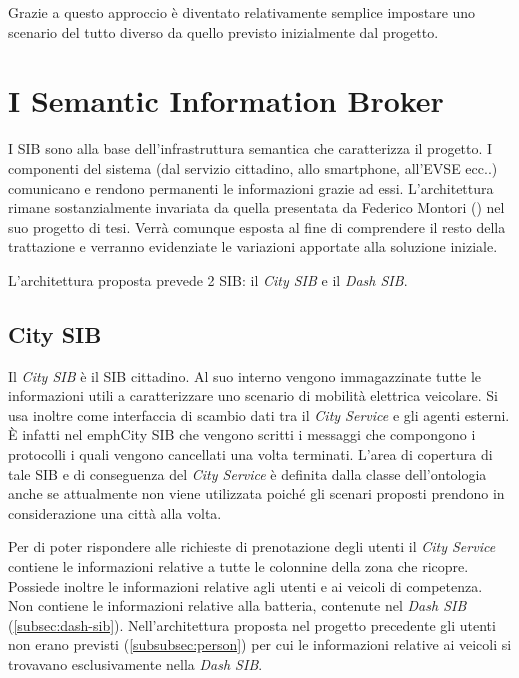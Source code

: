 Grazie a questo approccio è diventato relativamente semplice impostare uno scenario del tutto diverso da quello previsto inizialmente dal progetto.

\section{I Semantic Information Broker}

I SIB sono alla base dell'infrastruttura semantica che caratterizza il progetto. I componenti del sistema (dal servizio cittadino, allo smartphone, all'EVSE ecc..) comunicano e rendono permanenti le informazioni grazie ad essi. L'architettura rimane sostanzialmente invariata da quella presentata da Federico Montori (\cite{montori2012}) nel suo progetto di tesi. Verrà comunque esposta al fine di comprendere il resto della trattazione e verranno evidenziate le variazioni apportate alla soluzione iniziale.

L'architettura proposta prevede 2 SIB: il \emph{City SIB} e il \emph{Dash SIB}.

\subsection{City SIB}\label{subsec:city-sib}

Il \emph{City SIB} è il SIB cittadino. Al suo interno vengono immagazzinate tutte le informazioni utili a caratterizzare uno scenario di mobilità elettrica veicolare. Si usa inoltre come interfaccia di scambio dati tra il \emph{City Service} e gli agenti esterni. È infatti nel emph{City SIB} che vengono scritti i messaggi che compongono i protocolli i quali vengono cancellati una volta terminati. L'area di copertura di tale SIB e di conseguenza del \emph{City Service} è definita dalla classe dell'ontologia  anche se attualmente non viene utilizzata poiché gli scenari proposti prendono in considerazione una città alla volta.

Per di poter rispondere alle richieste di prenotazione degli utenti il \emph{City Service} contiene le informazioni relative a tutte le colonnine della zona che ricopre. Possiede inoltre le informazioni relative agli utenti e ai veicoli di competenza. Non contiene le informazioni relative alla batteria, contenute nel \emph{Dash SIB} (\ref{subsec:dash-sib}). Nell'architettura proposta nel progetto precedente gli utenti non erano previsti (\ref{subsubsec:person}) per cui le informazioni relative ai veicoli si trovavano esclusivamente nella \emph{Dash SIB}.

